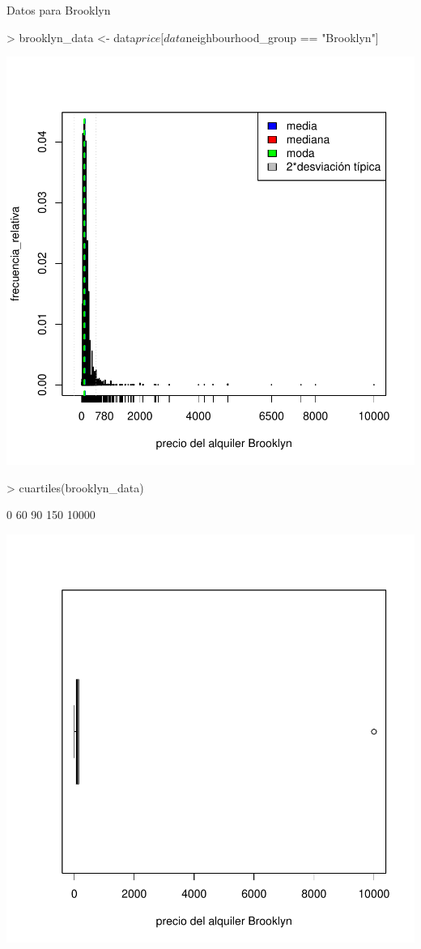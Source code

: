 \documentclass [a4paper] {article}
\begin{document}
Datos para Brooklyn
\begin{Schunk}
\begin{Sinput}
> brooklyn_data <- data$price[data$neighbourhood_group == "Brooklyn"]
\end{Sinput}
\end{Schunk}
\begin{center}
\includegraphics{entrega-brooklyn_data_plot}
\begin{Schunk}
\begin{Sinput}
> cuartiles(brooklyn_data)
\end{Sinput}
\begin{Soutput}
[1]     0    60    90   150 10000
\end{Soutput}
\end{Schunk}
\includegraphics{entrega-brooklyn_data_plot_c}
\end{center}
\end{document}
